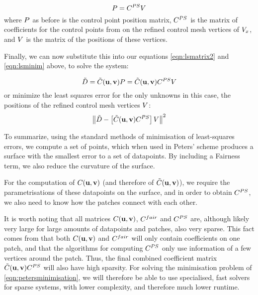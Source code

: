 \begin{equation}
\lsControlPointMatrix = \petersControlPointCoefMatrix\petersPatchPointMatrix
\end{equation}
where $\lsControlPointMatrix$ as before is the \Bez control point position matrix, $\petersControlPointCoefMatrix$ is the matrix of coefficients for the \Bez control points from on the refined control mesh vertices of $\petersPatchPoints$, and $\petersPatchPointMatrix$ is the matrix of the positions of these vertices. 

Finally, we can now substitute this into our equations \ref{eqn:lsmatrix2} and \ref{eqn:lsminim} above, to solve the system:

\begin{equation}
\lsDataPointConcMatrix = \lsControlCoefConcMatrix(\vec{u},\vec{v})\lsControlPointMatrix = \lsControlCoefConcMatrix(\vec{u},\vec{v})\petersControlPointCoefMatrix\petersPatchPointMatrix
\end{equation}
or minimize the least squares error for the only unknowns in this case, the positions of the refined control mesh vertices $\petersPatchPointMatrix$:
\begin{equation}
\norm{\lsDataPointConcMatrix - \left [\lsControlCoefConcMatrix(\vec{u},\vec{v})\petersControlPointCoefMatrix\right ]\petersPatchPointMatrix}^2
\label{eqn:petersminimisation}
\end{equation}

To summarize, using the standard methods of minimisation of least-squares errors, we compute a set of points, which when used in Peters' scheme produces a surface with the smallest error to a set of datapoints. By including a Fairness term, we also reduce the curvature of the surface.

For the computation of  $\lsControlPointCoefMatrix(\vec{u},\vec{v})$ (and therefore of $\lsControlCoefConcMatrix(\vec{u},\vec{v})$), we require the parametrisations of these datapoints on the surface, and in order to obtain $\petersControlPointCoefMatrix$, we also need to know how the patches connect with each other. 

It is worth noting that all matrices $\lsControlPointCoefMatrix(\vec{u},\vec{v})$, $\lsControlPointCoefMatrix^{fair}$ and $\petersControlPointCoefMatrix$ are, although likely very large for large amounts of datapoints and patches, also very sparse. This fact comes from that both $\lsControlPointCoefMatrix(\vec{u},\vec{v})$ and $\lsControlPointCoefMatrix^{fair}$ will only contain coefficients on one patch, and that the algorithms for computing $\petersControlPointCoefMatrix$ only use information of a few vertices around the patch. Thus, the final combined coefficient matrix $\lsControlCoefConcMatrix(\vec{u},\vec{v})\petersControlPointCoefMatrix$ will also have high sparsity. For solving the minimisation problem of \autoref{eqn:petersminimisation}, we will therefore be able to use specialised, fast solvers for sparse systems, with lower complexity, and therefore much lower runtime.

